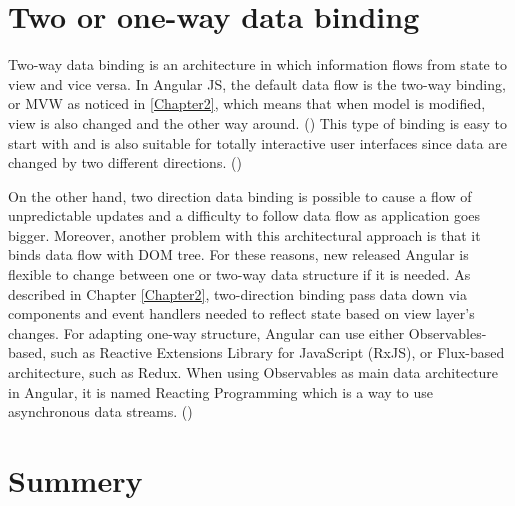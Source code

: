 \section{Two or one-way data binding}

Two-way data binding is an architecture in which information flows from state to view and vice versa. In Angular JS, the default data flow is the two-way binding, or MVW as noticed in \ref{Chapter2}, which means that when model is modified, view is also changed and the other way around. (\cite{murray2018ng}) This type of binding is easy to start with and is also suitable for totally interactive user interfaces since data are changed by two different directions. (\cite{Reference21}) \par

On the other hand, two direction data binding is possible to cause a flow of unpredictable updates and a difficulty to follow data flow as application goes bigger. Moreover, another problem with this architectural approach is that it binds data flow with DOM tree. For these reasons, new released Angular is flexible to change between one or two-way data structure if it is needed. As described in Chapter \ref{Chapter2}, two-direction binding pass data down via components and event handlers needed to reflect state based on view layer's changes. For adapting one-way structure, Angular can use either Observables-based, such as Reactive Extensions Library for JavaScript (RxJS), or Flux-based architecture, such as Redux. When using Observables as main data architecture in Angular, it is named Reacting Programming which is a way to use asynchronous data streams. (\cite{murray2018ng}) \par

\section{Summery}


